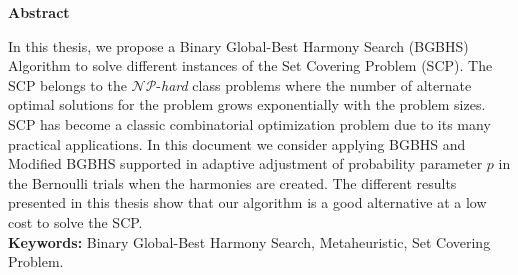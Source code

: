 \noindent
\Large{\textbf{Abstract}}\\

\normalsize

In this thesis, we propose a Binary Global-Best Harmony Search (BGBHS)  Algorithm to solve different instances of the Set Covering Problem (SCP). The SCP belongs to the $\mathcal{N} \mathcal{P}$-\textit{hard} class problems where the number of alternate optimal solutions for the problem grows exponentially with the problem sizes. SCP has become a classic combinatorial optimization problem due to its many practical applications. In this document we consider applying  BGBHS and Modified BGBHS supported in adaptive adjustment of probability parameter $p$ in the Bernoulli trials when the harmonies are created. The different results presented in this thesis show that our algorithm is a good alternative at a low cost to solve the SCP.\\


\textbf{Keywords:} Binary Global-Best Harmony Search, Metaheuristic, Set Covering Problem.